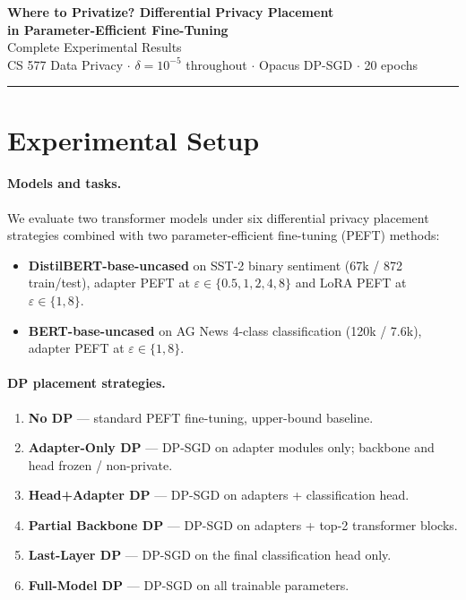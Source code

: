\documentclass[11pt,letterpaper]{article}
\newcommand{\eps}{\varepsilon}
\begin{document}
\begin{center}
  {\LARGE\bfseries Where to Privatize? Differential Privacy Placement\\
  in Parameter-Efficient Fine-Tuning}\\[0.6em]
  {\large Complete Experimental Results}\\[0.4em]
  {\normalsize CS 577 Data Privacy $\cdot$ $\delta = 10^{-5}$ throughout $\cdot$
               Opacus DP-SGD $\cdot$ 20 epochs}
\end{center}

\vspace{0.5em}
\hrule
\vspace{1em}

\section{Experimental Setup}

\paragraph{Models and tasks.}
We evaluate two transformer models under six differential privacy placement
strategies combined with two parameter-efficient fine-tuning (PEFT) methods:
\begin{itemize}
  \item \textbf{DistilBERT-base-uncased} on SST-2 binary sentiment
        (67k / 872 train/test), adapter PEFT at $\eps \in \{0.5,1,2,4,8\}$
        and LoRA PEFT at $\eps \in \{1,8\}$.
  \item \textbf{BERT-base-uncased} on AG News 4-class classification
        (120k / 7.6k), adapter PEFT at $\eps \in \{1,8\}$.
\end{itemize}

\paragraph{DP placement strategies.}
\begin{enumerate}
  \item \textbf{No DP} --- standard PEFT fine-tuning, upper-bound baseline.
  \item \textbf{Adapter-Only DP} --- DP-SGD on adapter modules only;
        backbone and head frozen / non-private.
  \item \textbf{Head+Adapter DP} --- DP-SGD on adapters + classification head.
  \item \textbf{Partial Backbone DP} --- DP-SGD on adapters + top-2 transformer blocks.
  \item \textbf{Last-Layer DP} --- DP-SGD on the final classification head only.
  \item \textbf{Full-Model DP} --- DP-SGD on all trainable parameters.
\end{enumerate}
\end{document}
